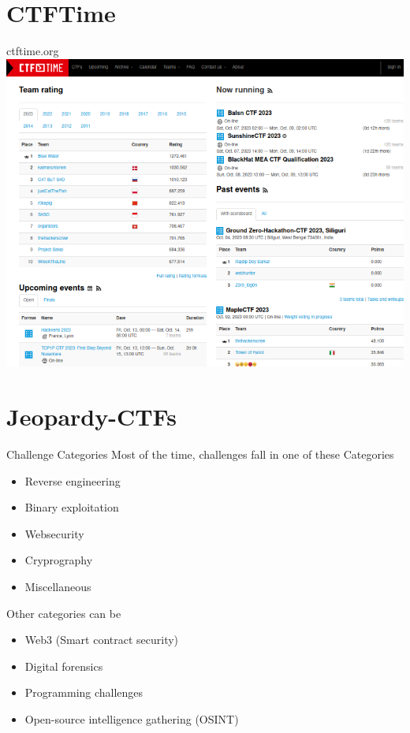 \documentclass[12pt]{beamer}
\begin{document}
\section{CTFTime}
\begin{frame}{ctftime.org}
    \centering
    \includegraphics[width=0.8\columnwidth]{images/CTFTimeStartpage.png}
\end{frame}


\section{Jeopardy-CTFs}
\begin{frame}{Challenge Categories}
    Most of the time, challenges fall in one of these Categories
    \begin{itemize}
        \item Reverse engineering
        \item Binary exploitation
        \item Websecurity
        \item Cryprography
        \item Miscellaneous
    \end{itemize}

    Other categories can be
    \begin{itemize}
        \item Web3 (Smart contract security)
        \item Digital forensics 
        \item Programming challenges
        \item Open-source intelligence gathering (OSINT)
    \end{itemize}
\end{frame}
\end{document}
